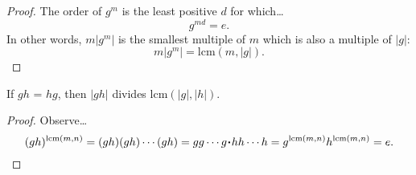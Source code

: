\begin{proof}
The order of $g^m$ is the least positive $d$ for which\dots
$$g^{md} = e.$$
In other words, $m|g^m|$ is the smallest multiple of $m$ which is also a multiple of $|g|$:
$$m|g^m| = \textrm{lcm}(m,|g|).$$
\end{proof}

\begin{proposition}
If $gh$ = $hg$, then $|gh|$ divides lcm$(|g|,|h|)$.
\end{proposition}

\begin{proof}
Observe\dots
$$(gh)^{\textrm{lcm}(m,n)} = (gh)(gh)\cdots(gh) = gg\cdots g \LargerCdot hh\cdots h = g^{\textrm{lcm}(m,n)}h^{\textrm{lcm}(m,n)} = e.$$
\end{proof}